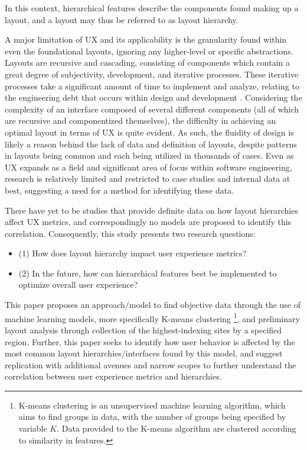 \documentclass[conference]{IEEEtran}
\begin{document}
In this context, hierarchical features describe the components found making up a layout, and a layout may thus be referred to as layout hierarchy.

A major limitation of UX and its applicability is the granularity found within even the foundational layouts, ignoring any higher-level or specific abstractions. Layouts are recursive and cascading, consisting of components which contain a great degree of subjectivity, development, and iterative processes. These iterative processes take a significant amount of time to implement and analyze, relating to the engineering debt that occurs within design and development \cite{4293575}. Considering the complexity of an interface composed of several different components (all of which are recursive and componentized themselves), the difficulty in achieving an optimal layout in terms of UX is quite evident. As such, the fluidity of design is likely a reason behind the lack of data and definition of layouts, despite patterns in layouts being common and each being utilized in thousands of cases. Even as UX expands as a field and significant area of focus within software engineering, research is relatively limited and restricted to case studies and internal data at best, suggesting a need for a method for identifying these data.

There have yet to be studies that provide definite data on how layout hierarchies affect UX metrics, and correspondingly no models are proposed to identify this correlation. Consequently, this study presents two research questions:

\renewcommand{\labelitemi}{$\textendash$}
\begin{itemize}
  \item (1) How does layout hierarchy impact user experience metrics?
  \item (2) In the future, how can hierarchical features best be implemented to optimize overall user experience?
\end{itemize}



This paper proposes an approach/model to find objective data through the use of machine learning models, more specifically K-means clustering \footnote{K-means clustering is an unsupervised machine learning algorithm, which aims to find groups in data, with the number of groups being specified by variable \(K\). Data provided to the K-means algorithm are clustered according to similarity in features.}, and preliminary layout analysis through collection of the highest-indexing sites by a specified region. Further, this paper seeks to identify how user behavior is affected by the most common layout hierarchies/interfaces found by this model, and suggest replication with additional avenues and narrow scopes to further understand the correlation between user experience metrics and hierarchies.
\end{document}
